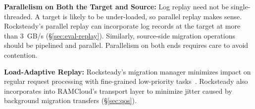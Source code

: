 
\noindent
\textbf{Parallelism on Both the Target and Source:} Log replay need not be
single-threaded.  A target is likely to be under-loaded, so parallel
replay makes sense. Rocksteady's parallel replay can incorporate log records
at the target at more than 3~GB/s (\S\ref{sec:eval-replay}). Similarly,
source-side migration operations should be pipelined and parallel. Parallelism
on both ends requires care to avoid contention.

\noindent
\textbf{Load-Adaptive Replay:} Rocksteady's migration manager minimizes impact
on regular request processing with fine-grained low-priority
tasks~\cite{morsel-driven-parallelism,sparrow}. Rocksteady also incorporates
into RAMCloud's transport layer to minimize jitter caused by background
migration transfers (\S\ref{sec:qos}).
